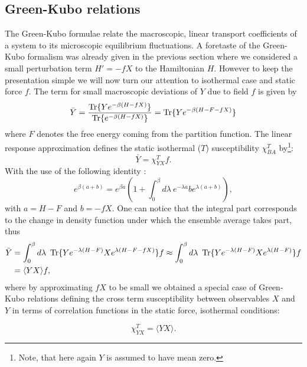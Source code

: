 \documentclass[a4paper,12pt]{article}
\begin{document}
\subsection{Green-Kubo relations}

The Green-Kubo formulae relate the macroscopic, linear transport coefficients of a system to its microscopic equilibrium fluctuations.
A foretaste of the Green-Kubo formalism was already given in the previous section where we considered a small perturbation term $H'=-f X$ to the Hamiltonian $H$. However to keep the presentation simple we will now turn our attention to isothermal case and static force $f$.
The term for small macroscopic deviations of $Y$ due to field $f$ is given by
\begin{equation}
\bar{Y}=\frac{\Tr\{ Y e^{-\beta (H-f X)} \}}{\Tr\{ e^{-\beta (H-f X)} \}} = \Tr\{ Y e^{-\beta (H - F -f X )} \}
\end{equation}
where $F$ denotes the free energy coming from the partition function. The linear response approximation defines the static isothermal ($T$) susceptibility $\chi_{BA}^T$ by\footnote{Note, that here again $Y$ is assumed to have mean zero.}:
\begin{equation}
  \bar{Y} =\chi_{YX}^T f.
\end{equation}
With the use of the following identity \cite{Kubo:1957cl}:
\begin{equation}
  e^{\beta (a+b) }=e^{\beta a} (1+\int_0^{\beta} d\lambda\ e^{-\lambda a} b e^{\lambda (a+b)}),
\end{equation}
with $a=H-F$ and $b=-f X$. One can notice that the integral part corresponds to the change in density function under which the ensemble average takes part, thus
\begin{equation}
\begin{aligned}
  \bar{Y} &= \int_0^{\beta} d\lambda\ \Tr\{ Y e^{-\lambda (H - F)} X e^{\lambda (H-F-f X)} \} f \approx  \int_0^{\beta} d\lambda\ \Tr\{ Y e^{-\lambda (H - F)} X e^{\lambda (H-F)} \} f \\
  &= \langle Y X \rangle f,
\end{aligned}
\end{equation}
where by approximating $f X$ to be small we obtained a special case of Green-Kubo relations defining the cross term susceptibility between observables $X$ and $Y$ in terms of correlation functions in the static force, isothermal conditions:

\begin{equation}
  \chi_{YX}^T = \langle Y X \rangle.
\end{equation}
\end{document}
